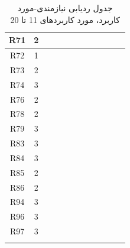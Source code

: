 \documentclass[12pt]{article}
\begin{document}
\begin{longtable}{|c|c|c|c|c|c|c|c|c|c|c|c|}
		\hline
		R71         & 2          &           &           &           &           &           &           &           &           &           &           \\
		\hline
		R72         & 1          &           &           &           &           &           &           &           &           &           &           \\
		\hline
		R73         & 2          &           &           &           &           &           &           &           &           &           &           \\
		\hline
		R74         & 3          &           &           &           &           &           &           &           &           &           &           \\
		\hline
		R76         & 2          &           &           &           &           &           &           &           &           &           &           \\
		\hline
		R78         & 2          & \ding{51} &           &           &           &           &           &           &           &           &           \\
		\hline
		R79         & 3          &           &           &           &           &           &           &           &           &           &           \\
		\hline
		R83         & 3          &           &           &           &           &           &           &           &           &           &           \\
		\hline
		R84         & 3          &           &           &           &           &           &           &           &           &           &           \\
		\hline
		R85         & 2          &           &           &           &           &           &           &           &           &           &           \\
		\hline
		R86         & 2          &           &           &           &           &           &           &           &           &           &           \\
		\hline
		R94         & 3          &           &           &           &           &           &           &           &           &           &           \\
		\hline
		R96         & 3          &           &           &           &           &           &           &           &           &           &           \\
		\hline
		R97         & 3          &           &           &           &           &           &           &           &           &           &           \\
		\hline
		\caption{جدول ردیابی نیازمندی-مورد کاربرد، مورد کاربردهای 11 تا 20}
	\end{longtable}
\end{document}
